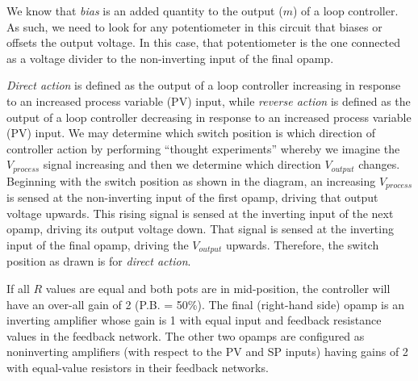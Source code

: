 We know that {\it bias} is an added quantity to the output ($m$) of a loop controller.  As such, we need to look for any potentiometer in this circuit that biases or offsets the output voltage.  In this case, that potentiometer is the one connected as a voltage divider to the non-inverting input of the final opamp.

\vskip 10pt

{\it Direct action} is defined as the output of a loop controller increasing in response to an increased process variable (PV) input, while {\it reverse action} is defined as the output of a loop controller decreasing in response to an increased process variable (PV) input.  We may determine which switch position is which direction of controller action by performing ``thought experiments'' whereby we imagine the $V_{process}$ signal increasing and then we determine which direction $V_{output}$ changes.  Beginning with the switch position as shown in the diagram, an increasing $V_{process}$ is sensed at the non-inverting input of the first opamp, driving that output voltage upwards.  This rising signal is sensed at the inverting input of the next opamp, driving its output voltage down.  That signal is sensed at the inverting input of the final opamp, driving the $V_{output}$ upwards.  Therefore, the switch position as drawn is for {\it direct action}.

\vskip 10pt

If all $R$ values are equal and both pots are in mid-position, the controller will have an over-all gain of 2 (P.B. = 50\%).  The final (right-hand side) opamp is an inverting amplifier whose gain is 1 with equal input and feedback resistance values in the feedback network.  The other two opamps are configured as noninverting amplifiers (with respect to the PV and SP inputs) having gains of 2 with equal-value resistors in their feedback networks.




